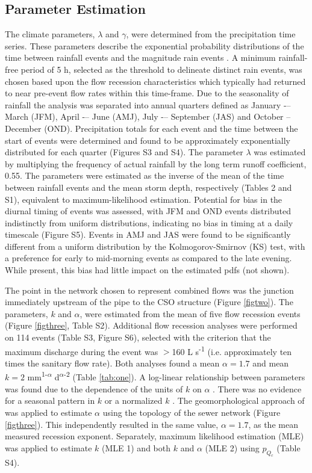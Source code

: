 \documentclass[draft,linenumbers]{agujournal2018}
\begin{document}
\subsection{Parameter Estimation}
The climate parameters, $\lambda$ and $\gamma$, were determined from the precipitation time series. These parameters describe the exponential probability distributions of the time between rainfall events and the magnitude rain events \citep{Rodriguez_Iturbe_1999}. A minimum rainfall-free period of 5 h, selected as the threshold to delineate distinct rain events, was chosen based upon the f\/low recession characteristics which typically had returned to near pre-event f\/low rates within this time-frame. Due to the seasonality of rainfall the analysis was separated into annual quarters def\/ined as January -– March (JFM), April -– June (AMJ), July -– September (JAS) and October -- December (OND). Precipitation totals for each event and the time between the start of events were determined and found to be approximately exponentially distributed for each quarter (Figures S3 and S4). The parameter $\lambda$ was estimated by multiplying the frequency of actual rainfall by the long term runof\/f coef\/f\/icient, 0.55. The parameters were estimated as the inverse of the mean of the time between rainfall events and the mean storm depth, respectively (Tables 2 and S1), equivalent to maximum-likelihood estimation. Potential for bias in the diurnal timing of events was assessed, with JFM and OND events distributed indistinctly from uniform distributions, indicating no bias in timing at a daily timescale (Figure S5). Events in AMJ and JAS were found to be signif\/icantly dif\/ferent from a uniform distribution by the Kolmogorov-Smirnov (KS) test, with a preference for early to mid-morning events as compared to the late evening. While present, this bias had little impact on the estimated pdfs (not shown).

The point in the network chosen to represent combined f\/lows was the junction immediately upstream of the pipe to the CSO structure (Figure \ref{figtwo}). The parameters, $k$ and $\alpha$, were estimated from the mean of f\/ive f\/low recession events \citep{Brutsaert_1977} (Figure \ref{figthree}, Table S2). Additional f\/low recession analyses were performed on 114 events (Table S3, Figure S6), selected with the criterion that the maximum discharge during the event was $>$160 L s\textsuperscript{-1} (i.e. approximately ten times the sanitary f\/low rate). Both analyses found a mean  $\alpha = 1.7$ and mean $k = 2$ mm\textsuperscript{1-$\alpha$} d\textsuperscript{$\alpha$-2} (Table \ref{tab:one}). A log-linear relationship between parameters was found due to the dependence of the units of $k$ on $\alpha$ \citep{Dralle_2015}. There was no evidence for a seasonal pattern in $k$ or a normalized $k$ \citep{Dralle_2015}. The geomorphological approach of \citet{Biswal_2014} was applied to estimate $\alpha$ using the topology of the sewer network (Figure \ref{figthree}). This independently resulted in the same value, $\alpha = 1.7$, as the mean measured recession exponent. Separately, maximum likelihood estimation (MLE) was applied to estimate $k$ (MLE 1) and both $k$ and $\alpha$ (MLE 2) using $p_{Q_c}$ (Table S4).
 
\end{document}
